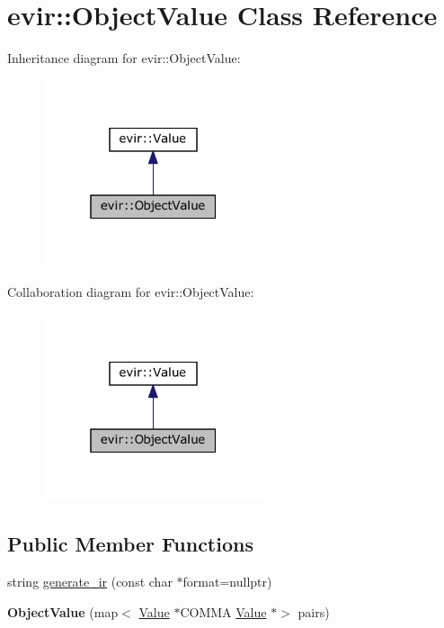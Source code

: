 \hypertarget{classevir_1_1ObjectValue}{}\section{evir\+:\+:Object\+Value Class Reference}
\label{classevir_1_1ObjectValue}


Inheritance diagram for evir\+:\+:Object\+Value\+:
\nopagebreak
\begin{figure}[H]
\begin{center}
\leavevmode
\includegraphics[width=184pt]{classevir_1_1ObjectValue__inherit__graph}
\end{center}
\end{figure}


Collaboration diagram for evir\+:\+:Object\+Value\+:
\nopagebreak
\begin{figure}[H]
\begin{center}
\leavevmode
\includegraphics[width=184pt]{classevir_1_1ObjectValue__coll__graph}
\end{center}
\end{figure}
\subsection*{Public Member Functions}
\begin{DoxyCompactItemize}
\item 
string \hyperlink{classevir_1_1ObjectValue_a1058f47731ab800327893e388fc2b2d0}{generate\+\_\+ir} (const char $\ast$format=nullptr)
\item 
\mbox{\label{classevir_1_1ObjectValue_aa73660ddf07e9428f8758c370b66c604}} 
{\bfseries Object\+Value} (map$<$ \hyperlink{classevir_1_1Value}{Value} $\ast$C\+O\+M\+MA \hyperlink{classevir_1_1Value}{Value} $\ast$$>$ pairs)
\end{DoxyCompactItemize}
